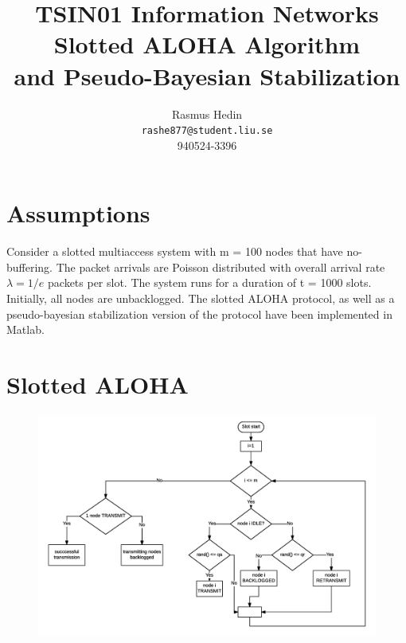 \documentclass{article}
\begin{document}
\title{%
  TSIN01 Information Networks \\
  \large Slotted ALOHA Algorithm \\
  and Pseudo-Bayesian Stabilization}
\author{Rasmus Hedin \\
  \texttt{rashe877@student.liu.se} \\
940524-3396}

\maketitle

\section{Assumptions}
Consider a slotted multiaccess system with m = 100 nodes that have no-buffering. The packet arrivals are Poisson distributed with overall arrival rate $\lambda = 1/e$ packets per slot. The system runs for a duration of t = 1000 slots. Initially, all nodes are unbacklogged. The slotted ALOHA protocol, as well as a pseudo-bayesian stabilization version of the protocol have been implemented in Matlab.

\section{Slotted ALOHA}
\begin{figure}[h]
  \includegraphics[width=.9\textwidth]{figures/flowchart.png}
\end{figure}
\end{document}

